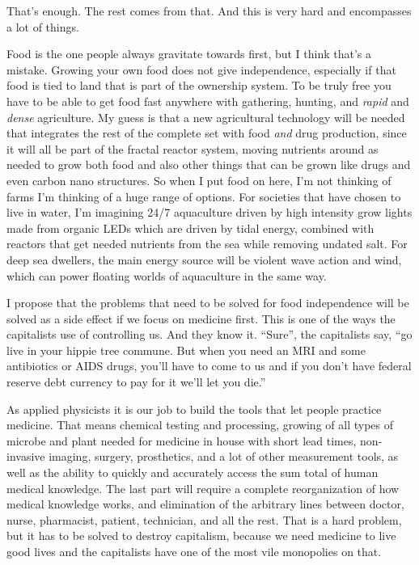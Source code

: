 That's enough. The rest comes from that. And this is very hard and
encompasses a lot of things.

Food is the one people always gravitate towards first, but I think
that's a mistake. Growing your own food does not give independence,
especially if that food is tied to land that is part of the ownership
system. To be truly free you have to be able to get food fast anywhere
with gathering, hunting, and \emph{rapid} and \emph{dense} agriculture.
My guess is that a new agricultural technology will be needed that
integrates the rest of the complete set with food \emph{and} drug
production, since it will all be part of the fractal reactor system,
moving nutrients around as needed to grow both food and also other
things that can be grown like drugs and even carbon nano structures. So
when I put food on here, I'm not thinking of farms I'm thinking of a
huge range of options. For societies that have chosen to live in water,
I'm imagining 24/7 aquaculture driven by high intensity grow lights made
from organic LEDs which are driven by tidal energy, combined with
reactors that get needed nutrients from the sea while removing undated
salt. For deep sea dwellers, the main energy source will be violent wave
action and wind, which can power floating worlds of aquaculture in the
same way.

I propose that the problems that need to be solved for food independence
will be solved as a side effect if we focus on medicine first. This is
one of the ways the capitalists use of controlling us. And they know it.
``Sure'', the capitalists say, ``go live in your hippie tree commune.
But when you need an MRI and some antibiotics or AIDS drugs, you'll have
to come to us and if you don't have federal reserve debt currency to pay
for it we'll let you die.''

As applied physicists it is our job to build the tools that let people
practice medicine. That means chemical testing and processing, growing
of all types of microbe and plant needed for medicine in house with
short lead times, non-invasive imaging, surgery, prosthetics, and a lot
of other measurement tools, as well as the ability to quickly and
accurately access the sum total of human medical knowledge. The last
part will require a complete reorganization of how medical knowledge
works, and elimination of the arbitrary lines between doctor, nurse,
pharmacist, patient, technician, and all the rest. That is a hard
problem, but it has to be solved to destroy capitalism, because we need
medicine to live good lives and the capitalists have one of the most
vile monopolies on that.

